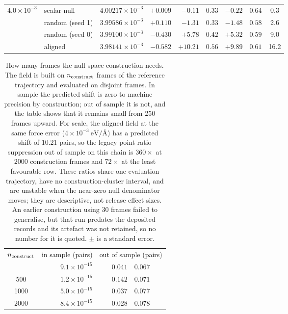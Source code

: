 \documentclass[aip,jcp,reprint,amsmath,amssymb,floatfix]{revtex4-2}
\newcommand{\eVA}{\ensuremath{\mathrm{eV}/\text{\AA}}}
\begin{document}
\begin{table}[t]
\begin{ruledtabular}
\begin{tabular}{llccr@{\,$\pm$\,}lr@{\,$\pm$\,}lc}
\colrule
$4.0\times10^{-3}$ & scalar-null     & $4.00217\times10^{-3}$ & $+0.009$ & $-0.11$ & $0.33$ & $-0.22$ & $0.64$ & 0.3 \\
                   & random (seed 1) & $3.99586\times10^{-3}$ & $+0.110$ & $-1.31$ & $0.33$ & $-1.48$ & $0.58$ & 2.6 \\
                   & random (seed 0) & $3.99100\times10^{-3}$ & $-0.430$ & $+5.78$ & $0.42$ & $+5.32$ & $0.59$ & 9.0 \\
                   & aligned         & $3.98141\times10^{-3}$ & $-0.582$ & $+10.21$ & $0.56$ & $+9.89$ & $0.61$ & 16.2 \\
\end{tabular}
\end{ruledtabular}
\end{table}

\begin{table}[t]
\caption{\label{tab:budget}%
How many frames the null-space construction needs. The field is built on
$n_{\rm construct}$ frames of the reference trajectory and evaluated on disjoint
frames. In sample the predicted shift is zero to machine precision by
construction; out of sample it is not, and the table shows that it remains small
from 250 frames upward. For scale, the aligned field at the same force error
($4\times10^{-3}~\eVA$) has a predicted shift of $10.21$ pairs, so the
legacy point-ratio suppression out of sample on this chain is $360\times$ at
2000 construction frames and $72\times$ at the least favourable row. These
ratios share one evaluation trajectory, have no construction-cluster interval,
and are unstable when the near-zero null denominator moves; they are descriptive,
not release effect sizes. An earlier construction using 30 frames
failed to generalise, but that run predates the deposited records and its
artefact was not retained, so no number for it is quoted. $\pm$ is a standard
error.}
\begin{ruledtabular}
\begin{tabular}{crr@{\,$\pm$\,}l}
$n_{\rm construct}$ & in sample (pairs) & \multicolumn{2}{c}{out of sample (pairs)} \\
\colrule
250  & $9.1\times10^{-15}$ & $0.041$ & $0.067$ \\
500  & $1.2\times10^{-15}$ & $0.142$ & $0.071$ \\
1000 & $5.0\times10^{-15}$ & $0.037$ & $0.077$ \\
2000 & $8.4\times10^{-15}$ & $0.028$ & $0.078$ \\
\end{tabular}
\end{ruledtabular}
\end{table}
\end{document}
